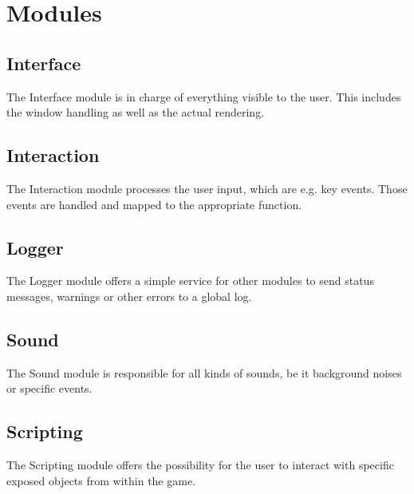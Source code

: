 \section{\color{fancy}Modules}


\subsection{Interface}

The Interface module is in charge of everything visible to the user.
This includes the window handling as well as the actual rendering.


\subsection{Interaction}

The Interaction module processes the user input, which are e.g. key events.
Those events are handled and mapped to the appropriate function.


\subsection{Logger}

The Logger module offers a simple service for other modules to send status messages, warnings or other errors to a global log.


\subsection{Sound}

The Sound module is responsible for all kinds of sounds, be it background noises or specific events.


\subsection{Scripting}

The Scripting module offers the possibility for the user to interact with specific exposed objects from within the game.
